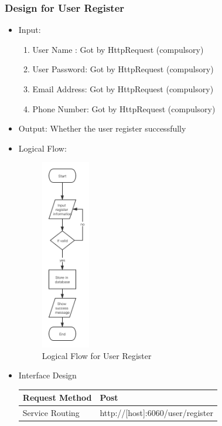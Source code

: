 \documentclass[16pt]{scrreprt}
\begin{document}
\subsubsection{Design for User Register}
\begin{itemize}
	\item Input: \\
	\begin{enumerate}
		\item User Name : Got by HttpRequest (compulsory)
		\item User Password: Got by HttpRequest (compulsory)
		\item Email Address: Got by HttpRequest (compulsory)
		\item Phone Number: Got by HttpRequest (compulsory)
	\end{enumerate}
	\item Output: Whether the user register successfully
	\item Logical Flow:
	 \begin{figure}[H]
	\centering
	\includegraphics[width=0.2\textwidth]{diagrams/register.png}
	\caption{Logical Flow for User Register}
\end{figure}
	\item Interface Design
	\begin{center}
    \begin{tabular}{p{5cm}p{10cm}}
        \hline
	    Request Method & Post\\
        \hline
	    Service Routing &  http://[host]:6060/user/register\\
        \hline

\end{tabular}
\end{center}
\end{itemize}
\end{document}

